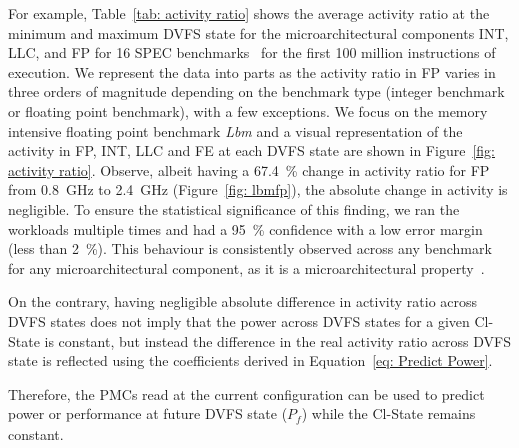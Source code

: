 For example, Table~\ref{tab: activity ratio} shows the average activity ratio at the
minimum and maximum DVFS state for the microarchitectural components INT, LLC, and FP for
16 SPEC benchmarks~\citep{2006core2} for the first 100 million instructions of execution.
We represent the data into parts as the activity ratio in FP varies in three orders of
magnitude depending on the benchmark type (integer benchmark or floating point benchmark),
with a few exceptions.  We focus on the memory intensive floating point benchmark
\emph{Lbm} and a visual representation of the activity in FP, INT, LLC and FE at each DVFS
state are shown in Figure~\ref{fig: activity ratio}. Observe, albeit having a
\SI{67.4}{\percent} change in activity ratio for FP from \SI{0.8}{\giga\hertz} to
\SI{2.4}{\giga\hertz} (Figure~\ref{fig: lbmfp}), the absolute change in activity is
negligible. To ensure the statistical significance of this finding, we ran the workloads
multiple times and had a \SI{95}{\percent} confidence with a low error margin (less than
\SI{2}{\percent}). This behaviour is consistently observed across any benchmark for any
microarchitectural component, as it is a microarchitectural
property~\citep{Su:2014:POP:2742155.2742200}.

On the contrary, having negligible absolute difference in activity ratio across DVFS states
does not imply that the power across DVFS states for a given Cl-State is constant, but
instead the difference in the real activity ratio across DVFS state is reflected using the
coefficients derived in Equation~\ref{eq: Predict Power}.

Therefore, the PMCs read at the current configuration can be used to predict power or
performance at future DVFS state ($P_\mathit{f}$) while the Cl-State remains constant. 


